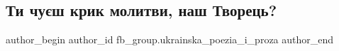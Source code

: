  
 
 
 
 

\subsection{Ти чуєш крик молитви, наш Творець?}
\label{sec:14_01_2023.fb.fb_group.ukrainska_poezia_i_proza.1.ti_chu_sh_krik_molit}

\ifcmt
 author_begin
   author_id fb_group.ukrainska_poezia_i_proza
 author_end
\fi
